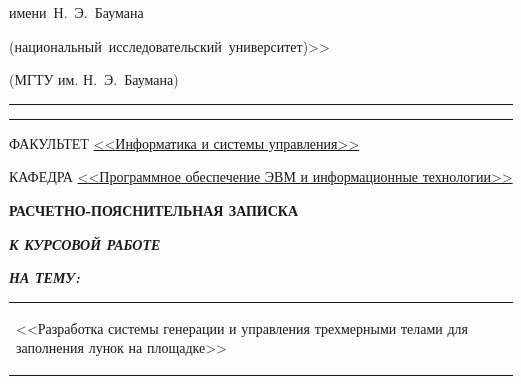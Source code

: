 \begin{titlepage}
\begin{center}
\begin{minipage}{0.85\textwidth}
{{                имени~Н.~Э.~Баумана

                (национальный~исследовательский~университет)>>
            }

                {(МГТУ им. Н.~Э.~Баумана)}
                \vspace{0.1cm}
            }
        \end{minipage}

        \vspace{0.2cm}
        \rule{\linewidth}{2.8pt}
        \rule[3ex]{\linewidth}{1pt}

        \begin{flushleft}
            {ФАКУЛЬТЕТ \uline{<<Информатика и системы управления>> \hfill}}

            \vspace{0.5cm}

            {КАФЕДРА \uline{<<Программное обеспечение ЭВМ и информационные технологии>> \hfill}}
        \end{flushleft}

        \vspace{2cm}

        {
            \Large{\textbf{РАСЧЕТНО-ПОЯСНИТЕЛЬНАЯ ЗАПИСКА}}

            \vspace{0.8cm}

            \large{\textbf{\textit{К КУРСОВОЙ РАБОТЕ}}}

            \vspace{0.75cm}

            \large{\textbf{\textit{НА ТЕМУ:}}}
        }

        \vspace{0.5cm}



        \begin{tabularx}{\linewidth}{@{}X@{}}
            \begin{center}
                \large <<Разработка \large системы \large генерации \large и \large управления \large трехмерными \large телами \large для \large заполнения \large лунок \large на \large площадке>>
                    \hfill
            \end{center}
        \end{tabularx}



\end{center}
\end{titlepage}
